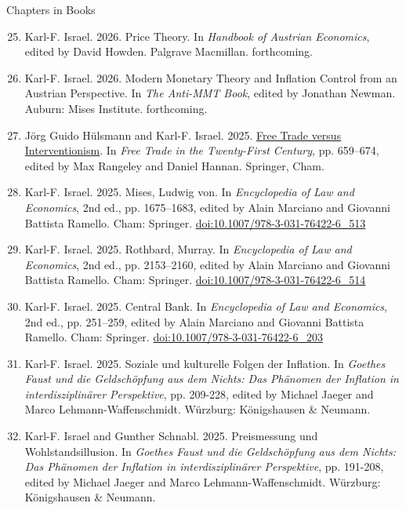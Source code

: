 \documentclass[11pt]{article}
\begin{document}
\begin{center}
    Chapters in Books
\end{center}
\begin{enumerate}
\setcounter{enumi}{24}
    \item Karl-F. Israel. 2026. Price Theory. In \textit{Handbook of Austrian Economics}, edited by David Howden. Palgrave Macmillan. forthcoming.
    \item Karl-F. Israel. 2026. Modern Monetary Theory and Inflation Control from an Austrian Perspective. In \textit{The Anti-MMT Book}, edited by Jonathan Newman. Auburn: Mises Institute. forthcoming. 
    \item Jörg Guido Hülsmann and Karl-F. Israel. 2025. \href{https://doi.org/10.1007/978-3-031-67656-7_36}{Free Trade versus Interventionism}. In \textit{Free Trade in the Twenty-First Century}, pp. 659–674, edited by Max Rangeley and Daniel Hannan. Springer, Cham.
    \item Karl-F. Israel. 2025. Mises, Ludwig von. In \textit{Encyclopedia of Law and Economics}, 2nd ed., pp. 1675–1683, edited by Alain Marciano and Giovanni Battista Ramello. Cham: Springer. \href{https://doi.org/10.1007/978-3-031-76422-6_513}{doi:10.1007/978-3-031-76422-6\_513}
    \item Karl-F. Israel. 2025. Rothbard, Murray. In \textit{Encyclopedia of Law and Economics}, 2nd ed., pp. 2153–2160, edited by Alain Marciano and Giovanni Battista Ramello. Cham: Springer. \href{https://doi.org/10.1007/978-3-031-76422-6_514}{doi:10.1007/978-3-031-76422-6\_514}
    \item Karl-F. Israel. 2025. Central Bank. In \textit{Encyclopedia of Law and Economics}, 2nd ed., pp. 251–259, edited by Alain Marciano and Giovanni Battista Ramello. Cham: Springer. \href{https://doi.org/10.1007/978-3-031-76422-6_203}{doi:10.1007/978-3-031-76422-6\_203}
    \item Karl-F. Israel. 2025. Soziale und kulturelle Folgen der Inflation. In \textit{Goethes Faust und die Geldschöpfung aus dem Nichts: Das Phänomen der Inflation in interdisziplinärer Perspektive}, pp. 209-228, edited by Michael Jaeger and Marco Lehmann-Waffenschmidt. Würzburg: Königshausen \& Neumann.
    \item Karl-F. Israel and Gunther Schnabl. 2025. Preismessung und Wohlstandsillusion. In \textit{Goethes Faust und die Geldschöpfung aus dem Nichts: Das Phänomen der Inflation in interdisziplinärer Perspektive}, pp. 191-208, edited by Michael Jaeger and Marco Lehmann-Waffenschmidt. Würzburg: Königshausen \& Neumann.

\end{enumerate}
\end{document}
